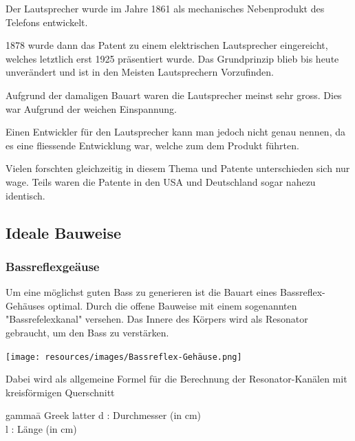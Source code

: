 \documentclass[a4paper,11pt]{report}
\begin{document}
Der Lautsprecher wurde im Jahre 1861 als mechanisches Nebenprodukt des Telefons entwickelt.

1878 wurde dann das Patent zu einem elektrischen Lautsprecher eingereicht, welches letztlich erst 1925 präsentiert wurde.
Das Grundprinzip blieb bis heute unverändert und ist in den Meisten Lautsprechern Vorzufinden. \cite{history_wikipedia}

Aufgrund der damaligen Bauart waren die Lautsprecher meinst sehr gross. Dies war Aufgrund der weichen Einspannung. \cite{history_connect}

Einen Entwickler für den Lautsprecher kann man jedoch nicht genau nennen, da es eine fliessende Entwicklung war, welche zum dem Produkt führten.

Vielen forschten gleichzeitig in diesem Thema und Patente unterschieden sich nur wage. Teils waren die Patente in den USA und Deutschland sogar nahezu identisch.\cite{history_tu_berlin}

\newpage
\subsection{Ideale Bauweise}
\subsubsection*{Bassreflexgeäuse}
\vspace{.5cm}
\noindent \begin{minipage}{0.6\textwidth}
    Um eine möglichst guten Bass zu generieren ist die Bauart eines Bassreflex-Gehäuses optimal. Durch die offene Bauweise mit einem sogenannten "Bassrefelexkanal" versehen.
    Das Innere des Körpers wird als Resonator gebraucht, um den Bass zu verstärken.
\end{minipage}
\hspace{0.1\textwidth}
\begin{minipage}{0.2\textwidth}
    \texttt{[image: resources/images/Bassreflex-Gehäuse.png]}
    \label{fig:bass-reflex}
\end{minipage}
\vspace{.5cm}

Dabei wird als allgemeine Formel für die Berechnung der Resonator-Kanälen mit kreisförmigen Querschnitt
\begin{tabbing}
    gamma\quad\= a Greek latter\kill
    d :    \>Durchmesser (in cm) \\
    l :    \>Länge (in cm)
\end{tabbing}
\end{document}
